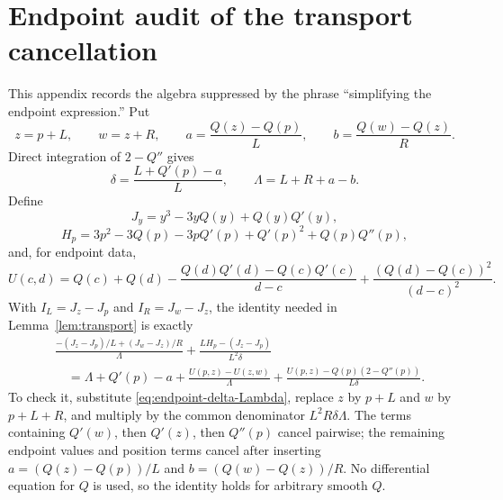 \section{Endpoint audit of the transport cancellation}\label{app:endpoints}

This appendix records the algebra suppressed by the phrase ``simplifying the
endpoint expression.'' Put
\[
 z=p+L,\qquad w=z+R,\qquad
 a=\frac{Q(z)-Q(p)}L,\qquad b=\frac{Q(w)-Q(z)}R.
\]
Direct integration of \(2-Q''\) gives
\begin{equation}\label{eq:endpoint-delta-Lambda}
 \delta=\frac{L+Q'(p)-a}{L},\qquad
 \Lambda=L+R+a-b.
\end{equation}
Define
\[
 J_y=y^3-3yQ(y)+Q(y)Q'(y),
\]
\[
 H_p=3p^2-3Q(p)-3pQ'(p)+Q'(p)^2+Q(p)Q''(p),
\]
and, for endpoint data,
\[
 U(c,d)=Q(c)+Q(d)-\frac{Q(d)Q'(d)-Q(c)Q'(c)}{d-c}
 +\frac{(Q(d)-Q(c))^2}{(d-c)^2}.
\]
With \(I_L=J_z-J_p\) and \(I_R=J_w-J_z\), the identity needed in
Lemma~\ref{lem:transport} is exactly
\begin{align*}
&\frac{-(J_z-J_p)/L+(J_w-J_z)/R}{\Lambda}
 +\frac{LH_p-(J_z-J_p)}{L^2\delta}\\
&\quad=\Lambda+Q'(p)-a
 +\frac{U(p,z)-U(z,w)}{\Lambda}
 +\frac{U(p,z)-Q(p)(2-Q''(p))}{L\delta}.
\end{align*}
To check it, substitute \eqref{eq:endpoint-delta-Lambda}, replace
\(z\) by \(p+L\) and \(w\) by \(p+L+R\), and multiply by the common
denominator \(L^2R\delta\Lambda\). The terms containing \(Q'(w)\), then
\(Q'(z)\), then \(Q''(p)\) cancel pairwise; the remaining endpoint values and
position terms cancel after inserting \(a=(Q(z)-Q(p))/L\) and
\(b=(Q(w)-Q(z))/R\). No differential equation for \(Q\) is used, so the
identity holds for arbitrary smooth \(Q\).
